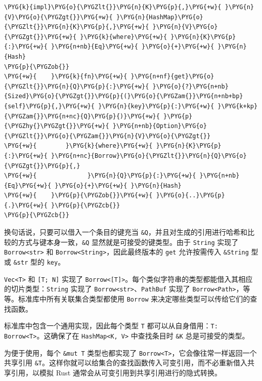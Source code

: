 \begin{Verbatim}[commandchars=\\\{\},breaklines=true,breakanywhere=true,fontsize=\codefont,xleftmargin=17bp]
\PYG{k}{impl}\PYG{o}{\PYGZlt{}}\PYG{n}{K}\PYG{p}{,}\PYG{+w}{ }\PYG{n}{V}\PYG{o}{\PYGZgt{}}\PYG{+w}{ }\PYG{n}{HashMap}\PYG{o}{\PYGZlt{}}\PYG{n}{K}\PYG{p}{,}\PYG{+w}{ }\PYG{n}{V}\PYG{o}{\PYGZgt{}}\PYG{+w}{ }\PYG{k}{where}\PYG{+w}{ }\PYG{n}{K}\PYG{p}{:}\PYG{+w}{ }\PYG{n+nb}{Eq}\PYG{+w}{ }\PYG{o}{+}\PYG{+w}{ }\PYG{n}{Hash}
\PYG{p}{\PYGZob{}}
\PYG{+w}{    }\PYG{k}{fn}\PYG{+w}{ }\PYG{n+nf}{get}\PYG{o}{\PYGZlt{}}\PYG{n}{Q}\PYG{p}{:}\PYG{+w}{ }\PYG{o}{?}\PYG{n+nb}{Sized}\PYG{o}{\PYGZgt{}}\PYG{p}{(}\PYG{o}{\PYGZam{}}\PYG{n+nb+bp}{self}\PYG{p}{,}\PYG{+w}{ }\PYG{n}{key}\PYG{p}{:}\PYG{+w}{ }\PYG{k+kp}{\PYGZam{}}\PYG{n+nc}{Q}\PYG{p}{)}\PYG{+w}{ }\PYG{p}{\PYGZhy{}\PYGZgt{}}\PYG{+w}{ }\PYG{n+nb}{Option}\PYG{o}{\PYGZlt{}}\PYG{o}{\PYGZam{}}\PYG{n}{V}\PYG{o}{\PYGZgt{}}
\PYG{+w}{        }\PYG{k}{where}\PYG{+w}{ }\PYG{n}{K}\PYG{p}{:}\PYG{+w}{ }\PYG{n+nc}{Borrow}\PYG{o}{\PYGZlt{}}\PYG{n}{Q}\PYG{o}{\PYGZgt{}}\PYG{p}{,}
\PYG{+w}{              }\PYG{n}{Q}\PYG{p}{:}\PYG{+w}{ }\PYG{n+nb}{Eq}\PYG{+w}{ }\PYG{o}{+}\PYG{+w}{ }\PYG{n}{Hash}
\PYG{+w}{    }\PYG{p}{\PYGZob{}}\PYG{+w}{ }\PYG{o}{..}\PYG{p}{.}\PYG{+w}{ }\PYG{p}{\PYGZcb{}}
\PYG{p}{\PYGZcb{}}
\end{Verbatim}

换句话说，只要可以借入一个条目的键充当 \texttt{\&Q}，并且对生成的引用进行哈希和比较的方式与键本身一致，\texttt{\&Q} 显然就是可接受的键类型。由于 \texttt{String} 实现了 \texttt{Borrow<str>} 和 \texttt{Borrow<String>}，因此最终版本的 \texttt{get} 允许按需传入 \texttt{\&String} 型或 \texttt{\&str} 型的 \texttt{key}。

\texttt{Vec<T>} 和 \texttt{[T; N]} 实现了 \texttt{Borrow<[T]>}。每个类似字符串的类型都能借入其相应的切片类型：\texttt{String} 实现了 \texttt{Borrow<str>}、\texttt{PathBuf} 实现了 \texttt{Borrow<Path>}，等等。标准库中所有关联集合类型都使用 \texttt{Borrow} 来决定哪些类型可以传给它们的查找函数。

标准库中包含一个通用实现，因此每个类型 \texttt{T} 都可以从自身借用：\texttt{T: Borrow<T>}。这确保了在 \texttt{HashMap<K, V>} 中查找条目时 \texttt{\&K} 总是可接受的类型。

为便于使用，每个 \texttt{\&mut T} 类型也都实现了 \texttt{Borrow<T>}，它会像往常一样返回一个共享引用 \texttt{\&T}。这样你就可以给集合的查找函数传入可变引用，而不必重新借入共享引用，以模拟 Rust 通常会从可变引用到共享引用进行的隐式转换。

